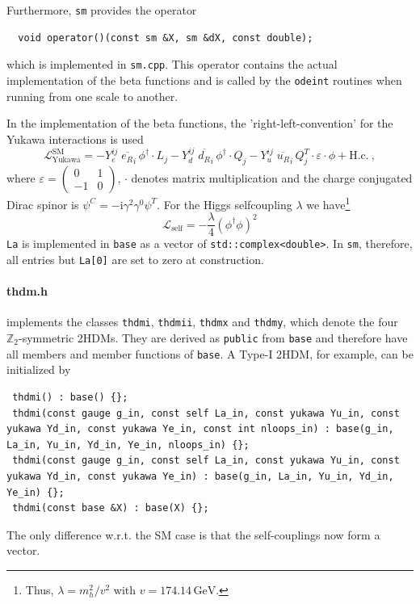 \documentclass[11pt,a4paper]{article}
\begin{document}
Furthermore, \texttt{sm} provides the operator
\begin{lstlisting}
  void operator()(const sm &X, sm &dX, const double);
\end{lstlisting}
which is implemented in \texttt{sm.cpp}. This operator contains the actual implementation of the beta functions and is called by the \texttt{odeint} routines when running from one scale to another.

In the implementation of the beta functions, the 'right-left-convention' for the Yukawa interactions is used
\begin{equation} \label{eq:sm_yuk}
    \mathcal{L}_{\mathrm{Yukawa}}^{\mathrm{SM}} = - Y_e^{ij}\; \overline{e_{R}}_{i} \, \phi^\dagger \cdot L_j
  - Y_d^{ij}\; \overline{d_{R}}_{i} \, \phi^\dagger \cdot Q_j
  - Y_u^{ij}\; \overline{u_{R}}_{i} \, Q_j^T \cdot \varepsilon \cdot \phi + \mathrm{H.c.}~,
\end{equation}
where $\varepsilon = \left(\begin{smallmatrix} 0 & 1 \\ -1 & 0 \end{smallmatrix}\right)$, $\cdot$ denotes matrix multiplication and the charge conjugated Dirac spinor is $\psi^C = -\mathrm{i}\gamma^2\gamma^0\psi^T$. For the Higgs selfcoupling $\lambda$ we have\footnote{Thus, $\lambda = m_h^2/v^2$ with $v=174.14\,\mathrm{GeV}$.}
\begin{equation} \label{eq:sm_la}
  \mathcal{L}_{\mathrm{self}} = -\frac{\lambda}{4} (\phi^\dagger\phi)^2
\end{equation}
\texttt{La} is implemented in \texttt{base} as a vector of \texttt{std::complex<double>}. In \texttt{sm}, therefore, all entries but \texttt{La[0]} are set to zero at construction.

\paragraph{thdm.h}
implements the classes \texttt{thdmi}, \texttt{thdmii}, \texttt{thdmx} and \texttt{thdmy}, which denote the four $\mathbb{Z}_2$-symmetric 2HDMs.
They are derived as \texttt{public} from \texttt{base} and therefore have all members and member functions of \texttt{base}.
A Type-I 2HDM, for example, can be initialized by
\begin{lstlisting}
 thdmi() : base() {};
 thdmi(const gauge g_in, const self La_in, const yukawa Yu_in, const yukawa Yd_in, const yukawa Ye_in, const int nloops_in) : base(g_in, La_in, Yu_in, Yd_in, Ye_in, nloops_in) {};
 thdmi(const gauge g_in, const self La_in, const yukawa Yu_in, const yukawa Yd_in, const yukawa Ye_in) : base(g_in, La_in, Yu_in, Yd_in, Ye_in) {};
 thdmi(const base &X) : base(X) {};
\end{lstlisting}
The only difference w.r.t. the SM case is that the self-couplings now form a vector.
\end{document}
